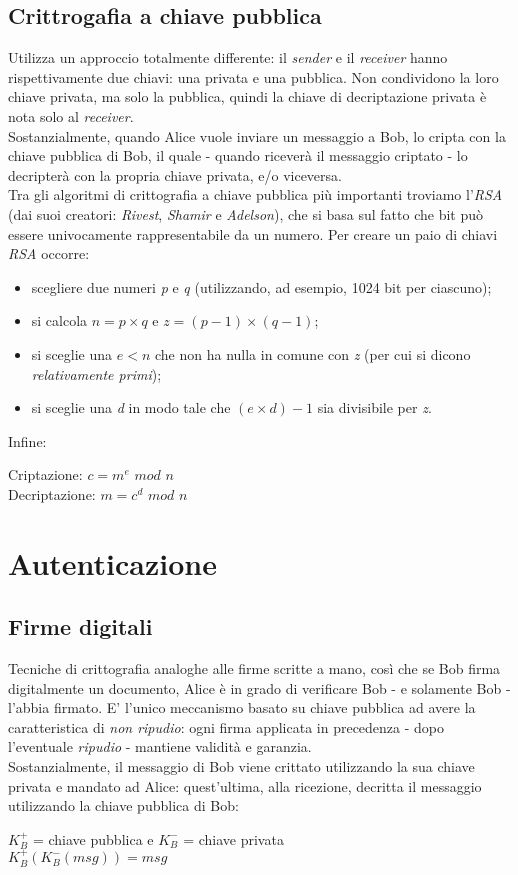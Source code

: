 \subsection{Crittrogafia a chiave pubblica}
Utilizza un approccio totalmente differente: il \textit{sender} e il \textit{receiver} hanno rispettivamente due chiavi: una privata e una pubblica. Non condividono la loro chiave privata, ma solo la pubblica, quindi la chiave di decriptazione privata è nota solo al \textit{receiver}. \\
Sostanzialmente, quando Alice vuole inviare un messaggio a Bob, lo cripta con la chiave pubblica di Bob, il quale - quando riceverà il messaggio criptato - lo decripterà con la propria chiave privata, e/o viceversa. \\
Tra gli algoritmi di crittografia a chiave pubblica più importanti troviamo l'\textit{RSA} (dai suoi creatori: \textit{Rivest}, \textit{Shamir} e \textit{Adelson}), che si basa sul fatto che bit può essere univocamente rappresentabile da un numero. Per creare un paio di chiavi \textit{RSA} occorre:
\begin{itemize}
	\item scegliere due numeri \textit{p} e \textit{q} (utilizzando, ad esempio, 1024 bit per ciascuno);
	\item si calcola $n=p\times q$ e $z=(p-1)\times (q-1)$;
	\item si sceglie una $e < n$ che non ha nulla in comune con \textit{z} (per cui si dicono \textit{relativamente primi});
	\item si sceglie una \textit{d} in modo tale che $(e\times d)-1$ sia divisibile per \textit{z}.
\end{itemize}
Infine:
\begin{center}
	Criptazione: $c = m^e$ $mod$ $n$ \\
	Decriptazione: $m = c^d$ $mod$ $n$
\end{center}

\section{Autenticazione}
\subsection{Firme digitali}
Tecniche di crittografia analoghe alle firme scritte a mano, così che se Bob firma digitalmente un documento, Alice è in grado di verificare Bob - e solamente Bob - l'abbia firmato.
E' l'unico meccanismo basato su chiave pubblica ad avere la caratteristica di \textit{non ripudio}: ogni firma applicata in precedenza - dopo l'eventuale \textit{ripudio} - mantiene validità e garanzia. \\
Sostanzialmente, il messaggio di Bob viene crittato utilizzando la sua chiave privata e mandato ad Alice: quest'ultima, alla ricezione, decritta il messaggio utilizzando la chiave pubblica di Bob:
\begin{center}
	$K_{B}^+ $ = chiave pubblica e $K_{B}^- $ = chiave privata \\
	$K_{B}^+(K_{B}^-(msg)) = msg $
\end{center}
